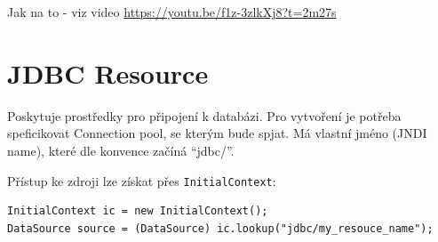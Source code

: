 \documentclass{szzclass}
\begin{document}
Jak na to - viz video \url{https://youtu.be/f1z-3zlkXj8?t=2m27s }

\section{JDBC Resource}
Poskytuje prostředky pro připojení k databázi. Pro vytvoření je potřeba speficikovat Connection pool, se kterým bude spjat. Má vlastní jméno (JNDI name), které dle konvence začíná “jdbc/”.

Přístup ke zdroji lze získat přes \texttt{InitialContext}:

\begin{verbatim}
InitialContext ic = new InitialContext();
DataSource source = (DataSource) ic.lookup("jdbc/my_resouce_name");
\end{verbatim}
\end{document}
